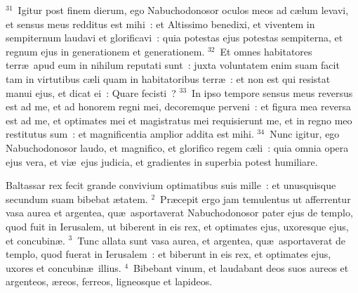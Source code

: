 ${}^{31}$~Igitur post finem dierum, ego Nabuchodonosor oculos meos ad c\ae lum levavi, et sensus meus redditus est mihi~: et Altissimo benedixi, et viventem in sempiternum laudavi et glorificavi~: quia potestas ejus potestas sempiterna, et regnum ejus in generationem et generationem.
${}^{32}$~Et omnes habitatores terr\ae\ apud eum in nihilum reputati sunt~: juxta voluntatem enim suam facit tam in virtutibus c\ae li quam in habitatoribus terr\ae~: et non est qui resistat manui ejus, et dicat ei~: Quare fecisti~?
${}^{33}$~In ipso tempore sensus meus reversus est ad me, et ad honorem regni mei, decoremque perveni~: et figura mea reversa est ad me, et optimates mei et magistratus mei requisierunt me, et in regno meo restitutus sum~: et magnificentia amplior addita est mihi.
${}^{34}$~Nunc igitur, ego Nabuchodonosor laudo, et magnifico, et glorifico regem c\ae li~: quia omnia opera ejus vera, et vi\ae\ ejus judicia, et gradientes in superbia potest humiliare.

\bchapter
\lettrine[lines=3,image=true,loversize=0.05,lraise=-0.03]{B}{}altassar rex fecit grande convivium optimatibus suis mille~: et unusquisque secundum suam bibebat \ae tatem.
${}^{2}$~Pr\ae cepit ergo jam temulentus ut afferrentur vasa aurea et argentea, qu\ae\ asportaverat Nabuchodonosor pater ejus de templo, quod fuit in Ierusalem, ut biberent in eis rex, et optimates ejus, uxoresque ejus, et concubin\ae .
${}^{3}$~Tunc allata sunt vasa aurea, et argentea, qu\ae\ asportaverat de templo, quod fuerat in Ierusalem~: et biberunt in eis rex, et optimates ejus, uxores et concubin\ae\ illius.
${}^{4}$~Bibebant vinum, et laudabant deos suos aureos et argenteos, \ae reos, ferreos, ligneosque et lapideos.


